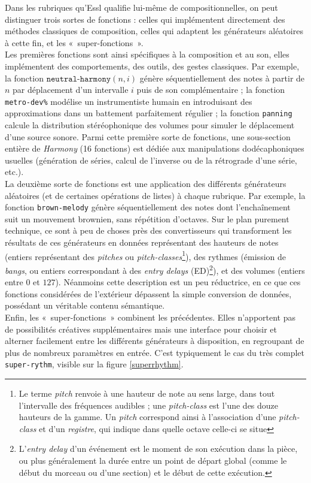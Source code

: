 \documentclass[a4paper,12pt]{article}
\newcommand{\guill}[1]{«~#1~»}
\begin{document}
Dans les rubriques qu'Essl qualifie lui-même de compositionnelles, on peut distinguer trois sortes de fonctions : celles qui implémentent directement des méthodes classiques de composition, celles qui adaptent les générateurs aléatoires à cette fin, et les \guill{super-fonctions}. \\
Les premières fonctions sont ainsi spécifiques à la composition et au son, elles implémentent des comportements, des outils, des gestes classiques. Par exemple, la fonction $\texttt{neutral-harmony}(n,i)$ génère séquentiellement des notes à partir de $n$ par déplacement d'un intervalle $i$ puis de son complémentaire ; la fonction \texttt{metro-dev\%} modélise un instrumentiste humain en introduisant des approximations dans un battement parfaitement régulier ; la fonction \texttt{panning} calcule la distribution stéréophonique des volumes pour simuler le déplacement d'une source sonore. Parmi cette première sorte de fonctions, une sous-section entière de \emph{Harmony} (16 fonctions) est dédiée aux manipulations dodécaphoniques usuelles (génération de séries, calcul de l'inverse ou de la rétrograde d'une série, etc.). \\
La deuxième sorte de fonctions est une application des différents générateurs aléatoires (et de certaines opérations de listes) à chaque rubrique. Par exemple, la fonction \texttt{brown-melody} génère séquentiellement des notes dont l'enchaînement suit un mouvement brownien, sans répétition d'octaves. Sur le plan purement technique, ce sont à peu de choses près des convertisseurs qui transforment les résultats de ces générateurs en données représentant des hauteurs de notes (entiers représentant des \emph{pitches} ou \emph{pitch-classes}\footnote{Le terme \emph{pitch} renvoie à une hauteur de note au sens large, dans tout l'intervalle des fréquences audibles ; une \emph{pitch-class} est l'une des douze hauteurs de la gamme. Un \emph{pitch} correspond ainsi à l'association d'une \emph{pitch-class} et d'un \emph{registre}, qui indique dans quelle octave celle-ci se situe}), des rythmes (émission de \emph{bangs}, ou entiers correspondant à des \emph{entry delays} (ED)\footnote{L'\emph{entry delay} d'un événement est le moment de son exécution dans la pièce, ou plus généralement la durée entre un point de départ global (comme le début du morceau ou d'une section) et le début de cette exécution.}), et des volumes (entiers entre $0$ et $127$). Néanmoins cette description est un peu réductrice, en ce que ces fonctions considérées de l'extérieur dépassent la simple conversion de données, possédant un véritable contenu sémantique. \\
Enfin, les \guill{super-fonctions} combinent les précédentes. Elles n'apportent pas de possibilités créatives supplémentaires mais une interface pour choisir et alterner facilement entre les différents générateurs à disposition, en regroupant de plus de nombreux paramètres en entrée. C'est typiquement le cas du très complet \texttt{super-rythm}, visible sur la figure \ref{superrhythm}.
\end{document}
